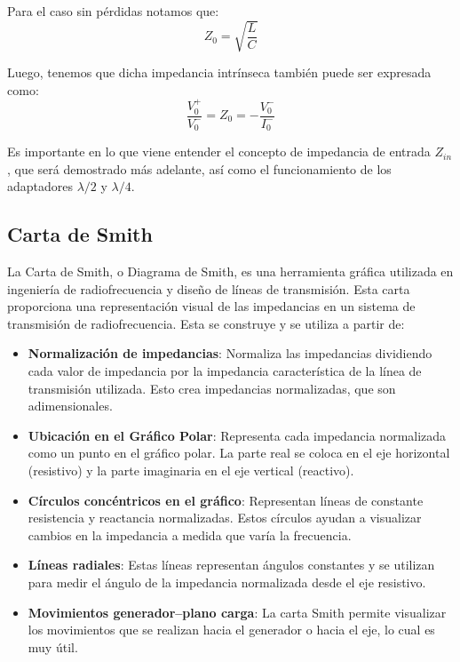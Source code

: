 \documentclass[
  11pt,
  letterpaper,
   addpoints,
   answers
  ]{exam}
\begin{document}
Para el caso sin pérdidas notamos que:
\begin{equation}
    Z_0 = \sqrt{\frac{L}{C}} \tag{9}
\end{equation}

Luego, tenemos que dicha impedancia intrínseca también puede ser expresada como:
\begin{equation}
    \frac{V_0^+}{V_0^-} = Z_0 = -\frac{V_0^-}{I_0^-} \tag{10}
\end{equation}

Es importante en lo que viene entender el concepto de impedancia de entrada $Z_{in}$, que será demostrado más adelante, así como el funcionamiento de los adaptadores $\lambda/2$ y $\lambda/4$.

\subsection*{Carta de Smith}

La Carta de Smith, o Diagrama de Smith, es una herramienta gráfica utilizada en ingeniería de radiofrecuencia y diseño de líneas de transmisión. Esta carta proporciona una representación visual de las impedancias en un sistema de transmisión de radiofrecuencia. Esta se construye y se utiliza a partir de:
\begin{itemize}
    \item \textbf{Normalización de impedancias}: Normaliza las impedancias dividiendo cada valor de impedancia por la impedancia característica de la línea de transmisión utilizada. Esto crea impedancias normalizadas, que son adimensionales.
    \item \textbf{Ubicación en el Gráfico Polar}: Representa cada impedancia normalizada como un punto en el gráfico polar. La parte real se coloca en el eje horizontal (resistivo) y la parte imaginaria en el eje vertical (reactivo).
    \item \textbf{Círculos concéntricos en el gráfico}: Representan líneas de constante resistencia y reactancia normalizadas. Estos círculos ayudan a visualizar cambios en la impedancia a medida que varía la frecuencia.
    \item \textbf{Líneas radiales}: Estas líneas representan ángulos constantes y se utilizan para medir el ángulo de la impedancia normalizada desde el eje resistivo.
    \item \textbf{Movimientos generador--plano carga}: La carta Smith permite visualizar los movimientos que se realizan hacia el generador o hacia el eje, lo cual es muy útil.
\end{itemize}
\end{document}
